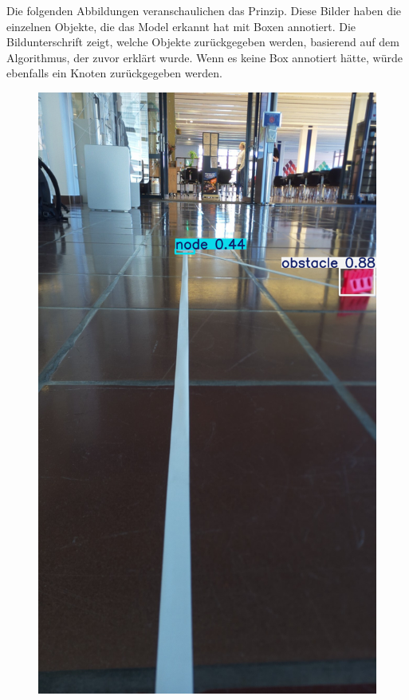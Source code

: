 Die folgenden Abbildungen veranschaulichen das Prinzip. Diese Bilder haben die einzelnen Objekte, die das Model erkannt hat mit Boxen annotiert. Die Bildunterschrift zeigt, welche Objekte zurückgegeben werden, basierend auf dem Algorithmus, der zuvor erklärt wurde. Wenn es keine Box annotiert hätte, würde ebenfalls ein Knoten zurückgegeben werden.

\begin{figure}[H]
  \centering
    \begin{minipage}[b]{0.23\textwidth}
    \centering
    \includegraphics[width=\textwidth]{assets/IT/testing/yolo/node-obst-on-the-side_annot.png}

\end{minipage}
\end{figure}
